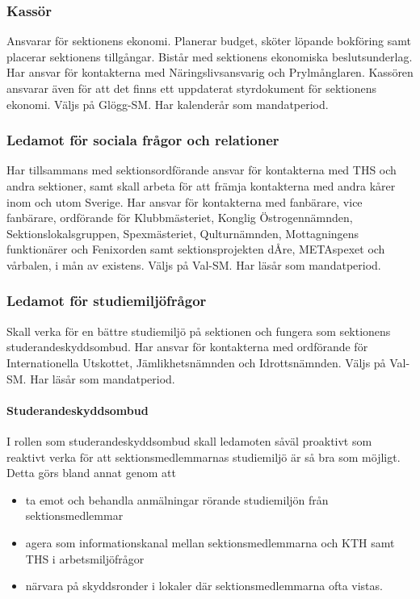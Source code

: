 \documentclass{dgovdoc}
\begin{document}
\subsubsection{Kassör}

Ansvarar för sektionens ekonomi. Planerar budget, sköter löpande bokföring samt placerar sektionens tillgångar. Bistår med sektionens ekonomiska beslutsunderlag. Har ansvar för kontakterna med Näringslivsansvarig och Prylmånglaren. Kassören ansvarar även för att det finns ett uppdaterat styrdokument för sektionens ekonomi.
Väljs på Glögg-SM. Har kalenderår som mandatperiod.

\subsubsection{Ledamot för sociala frågor och relationer}

Har tillsammans med sektionsordförande ansvar för kontakterna med THS och andra sektioner, samt skall arbeta för att främja kontakterna med andra kårer inom och utom Sverige. Har ansvar för kontakterna med fanbärare, vice fanbärare, ordförande för Klubbmästeriet, Konglig Östrogennämnden, Sektionslokalsgruppen, Spexmästeriet, Qulturnämnden, Mottagningens funktionärer och Fenixorden samt sektionsprojekten dÅre, METAspexet och vårbalen, i mån av existens. Väljs på Val-SM. Har läsår som mandatperiod.

\subsubsection{Ledamot för studiemiljöfrågor}

Skall verka för en bättre studiemiljö på sektionen och fungera som sektionens
studerandeskyddsombud. Har ansvar för kontakterna med ordförande för Internationella Utskottet, Jämlikhetsnämnden och Idrottsnämnden. Väljs på Val-SM. Har läsår som mandatperiod.

\paragraph{Studerandeskyddsombud}

I rollen som studerandeskyddsombud skall ledamoten såväl proaktivt som reaktivt verka för att sektionsmedlemmarnas studiemiljö är så bra som möjligt. Detta görs bland annat genom att

\begin{itemize}
  \item ta emot och behandla anmälningar rörande studiemiljön från sektionsmedlemmar
  \item agera som informationskanal mellan sektionsmedlemmarna och KTH samt THS i arbetsmiljöfrågor
  \item närvara på skyddsronder i lokaler där sektionsmedlemmarna ofta vistas.
\end{itemize}
\end{document}
